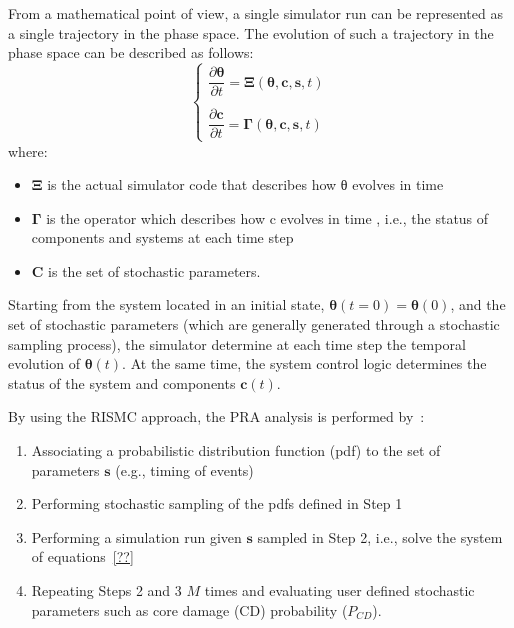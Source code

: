 From a mathematical point of view, a single simulator run can be represented as a single trajectory in the 
phase space. The evolution of such a trajectory in the phase space can be described as follows:
\begin{equation}
  \begin{cases}
    \dfrac{\partial \boldsymbol \theta }{\partial t}  = \boldsymbol \Xi (\boldsymbol \theta , \boldsymbol c, \boldsymbol s , t)   \\ \\ 
    \dfrac{\partial \boldsymbol c }{\partial t}  = \boldsymbol \Gamma (\boldsymbol \theta , \boldsymbol c, \boldsymbol s , t) 
  \end{cases}    
  \label{eq:trajectory}
\end{equation}
where:
\begin{itemize}
  \item $\boldsymbol \Xi$ is the actual simulator code that describes how θ evolves in time
  \item $\boldsymbol \Gamma$ is the operator which describes how c evolves in time , i.e., the status 
        of components and systems at each time step
  \item $\boldsymbol C$ is the set of stochastic parameters.
\end{itemize}

Starting from the system located in an initial state, $\boldsymbol \theta (t=0) = \boldsymbol \theta(0)$, 
and the set of stochastic parameters (which are generally generated through a stochastic sampling process), 
the simulator determine at each 
time step the temporal evolution of $\boldsymbol \theta (t)$. At the same time, the system control logic  
determines the status of the system and components $\boldsymbol c(t)$.
 
By using the RISMC approach, the PRA analysis is performed by~\cite{}:
\begin{enumerate}
  \item Associating a probabilistic distribution function (pdf) to the set of parameters 
        $\boldsymbol s$ (e.g., timing of events)
  \item Performing stochastic sampling of the pdfs defined in Step 1
  \item Performing a simulation run given $\boldsymbol s$ sampled in Step 2, i.e., solve the 
        system of equations~\ref{??}
  \item Repeating Steps 2 and 3 $M$ times and evaluating user defined stochastic parameters such 
        as core damage (CD) probability ($P_{CD}$).
\end{enumerate}

